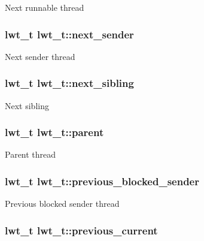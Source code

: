 Next runnable thread \hypertarget{structlwt_a77161e9127f308ba8540546c705cc3d9}{
\subsubsection[{next\+\_\+sender}]{\setlength{\rightskip}{0pt plus 5cm}lwt\+\_\+t lwt\+\_\+t\+::next\+\_\+sender}}\label{structlwt_a77161e9127f308ba8540546c705cc3d9}
Next sender thread \hypertarget{structlwt_a5557ab4e2bdd3634b38f5035461767d6}{
\subsubsection[{next\+\_\+sibling}]{\setlength{\rightskip}{0pt plus 5cm}lwt\+\_\+t lwt\+\_\+t\+::next\+\_\+sibling}}\label{structlwt_a5557ab4e2bdd3634b38f5035461767d6}
Next sibling \hypertarget{structlwt_a1849cde569fc8f254db05365de570b0e}{
\subsubsection[{parent}]{\setlength{\rightskip}{0pt plus 5cm}lwt\+\_\+t lwt\+\_\+t\+::parent}}\label{structlwt_a1849cde569fc8f254db05365de570b0e}
Parent thread \hypertarget{structlwt_a2060a9eb6fe521e93c509e10e2778907}{
\subsubsection[{previous\+\_\+blocked\+\_\+sender}]{\setlength{\rightskip}{0pt plus 5cm}lwt\+\_\+t lwt\+\_\+t\+::previous\+\_\+blocked\+\_\+sender}}\label{structlwt_a2060a9eb6fe521e93c509e10e2778907}
Previous blocked sender thread \hypertarget{structlwt_afe18cb4e9b5f4c60289674d2298993a2}{
\subsubsection[{previous\+\_\+current}]{\setlength{\rightskip}{0pt plus 5cm}lwt\+\_\+t lwt\+\_\+t\+::previous\+\_\+current}}\label{structlwt_afe18cb4e9b5f4c60289674d2298993a2}
